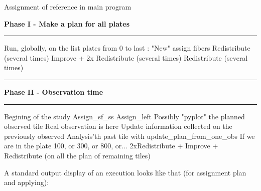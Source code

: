 \documentclass{article}
\newcommand\Algphasee[1]{%
\Statex\hspace*{-\algorithmicindent}\textbf{#1}%
\vspace*{-.7\baselineskip}\Statex\hspace*{\dimexpr-\algorithmicindent-2pt\relax}\rule{\linewidth}{0.4pt}%
}
\newcommand\Algphase[1]{%
\vspace*{-.7\baselineskip}\Statex\hspace*{\dimexpr-\algorithmicindent-2pt\relax}\rule{\linewidth}{0.4pt}%
\Statex\hspace*{-\algorithmicindent}\textbf{#1}%
\vspace*{-.7\baselineskip}\Statex\hspace*{\dimexpr-\algorithmicindent-2pt\relax}\rule{\linewidth}{0.4pt}%
}
\begin{document}
\begin{algorithm}[H]
	\caption{Assignment of reference in main program}\label{euclid}
	\begin{algorithmic}[1]
		\Algphasee{Phase I - Make a plan for all plates}
		\State Run, globally, on the list plates from 0 to last :
		\State "New" assign fibers
		\State Redistribute (several times)
		\State Improve + 2x Redistribute (several times)
		\State Redistribute (several times)
	\end{algorithmic}
	\begin{algorithmic}[1]
		\Algphase{Phase II - Observation time}
		\State Begining of the study
		\State Assign\_sf\_ss
		\State Assign\_left
		\State Possibly "pyplot" the planned observed tile
		\State Real observation is here
		\State Update information collected on the previously observed Analysis'th past tile with update\_plan\_from\_one\_obs
		\State If we are in the plate 100, or 300, or 800, or... 2xRedistribute + Improve + Redistribute (on all the plan of remaining tiles)
		\EndFor
	\end{algorithmic}
\end{algorithm}

A standard output display of an execution looks like that (for assignment plan and applying):
\end{document}
